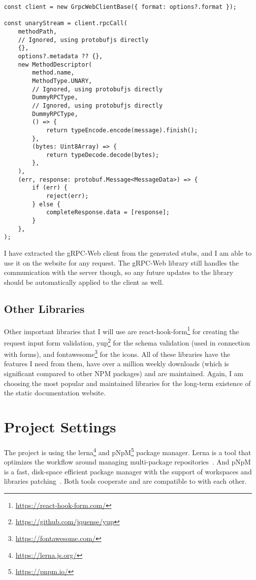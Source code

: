 \begin{lstlisting}[style=JavaScript, caption={gRPC-Web extracted client unary call example}, label={lst:grpc-web-client}]
const client = new GrpcWebClientBase({ format: options?.format });

const unaryStream = client.rpcCall(
    methodPath,
    // Ignored, using protobufjs directly
    {},
    options?.metadata ?? {},
    new MethodDescriptor(
        method.name,
        MethodType.UNARY,
        // Ignored, using protobufjs directly
        DummyRPCType,
        // Ignored, using protobufjs directly
        DummyRPCType,
        () => {
            return typeEncode.encode(message).finish();
        },
        (bytes: Uint8Array) => {
            return typeDecode.decode(bytes);
        },
    ),
    (err, response: protobuf.Message<MessageData>) => {
        if (err) {
            reject(err);
        } else {
            completeResponse.data = [response];
        }
    },
);
\end{lstlisting}


I have extracted the gRPC-Web client from the generated stubs, and I am able to use it on the website for any request.
The gRPC-Web library still handles the communication with the server though, so any future updates to the library should be automatically applied to the client as well.

\subsection{Other Libraries}
Other important libraries that I will use are react-hook-form\footnote{\url{https://react-hook-form.com/}} for creating the request input form validation, yup\footnote{\url{https://github.com/jquense/yup}} for the schema validation (used in connection with forms), and fontawesome\footnote{\url{https://fontawesome.com/}} for the icons.
All of these libraries have the features I need from them, have over a million weekly downloads (which is significant compared to other NPM packages) and are maintained.
Again, I am choosing the most popular and maintained libraries for the long-term existence of the static documentation website.


\section{Project Settings}
The project is using the lerna\footnote{\url{https://lerna.js.org/}} and pNpM\footnote{\url{https://pnpm.io/}} package manager.
Lerna is a tool that optimizes the workflow around managing multi-package repositories~\cite{lerna}.
And pNpM is a fast, disk-space efficient package manager with the support of workspaces and libraries patching~\cite{pnpm}.
Both tools cooperate and are compatible to with each other.

